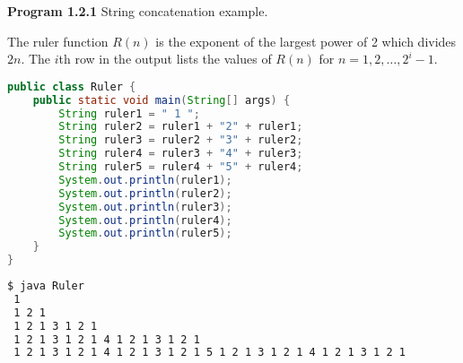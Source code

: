 \documentclass[8pt,a4paper,compress]{beamer}
\begin{document}
\begin{frame}[fragile]
\pause

\textbf{Program 1.2.1} String concatenation example. 

\begin{framed}
\tiny The ruler function $R(n)$ is the exponent of the largest power of 2 which divides $2n$. The $i$th row in the output lists the values of $R(n)$ for $n=1,2,\dots,2^i-1$.
\end{framed}

\begin{lstlisting}[language=Java]
public class Ruler { 
    public static void main(String[] args) { 
        String ruler1 = " 1 ";
        String ruler2 = ruler1 + "2" + ruler1;
        String ruler3 = ruler2 + "3" + ruler2;
        String ruler4 = ruler3 + "4" + ruler3;
        String ruler5 = ruler4 + "5" + ruler4;
        System.out.println(ruler1);
        System.out.println(ruler2);
        System.out.println(ruler3);
        System.out.println(ruler4);
        System.out.println(ruler5);
    }
}
\end{lstlisting}

\pause

\begin{lstlisting}[language=bash]
$ java Ruler
 1 
 1 2 1 
 1 2 1 3 1 2 1 
 1 2 1 3 1 2 1 4 1 2 1 3 1 2 1 
 1 2 1 3 1 2 1 4 1 2 1 3 1 2 1 5 1 2 1 3 1 2 1 4 1 2 1 3 1 2 1 
\end{lstlisting}
\end{frame}
\end{document}
